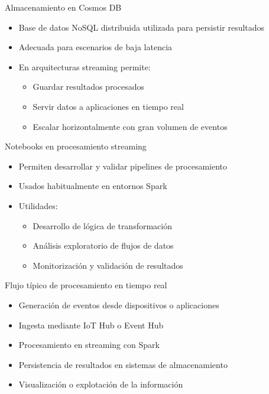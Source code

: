 \documentclass{beamer}
\begin{document}
\begin{frame}{Almacenamiento en Cosmos DB}
\begin{itemize}
    \item Base de datos NoSQL distribuida utilizada para persistir resultados
    \item Adecuada para escenarios de baja latencia
    \item En arquitecturas streaming permite:
    \begin{itemize}
        \item Guardar resultados procesados
        \item Servir datos a aplicaciones en tiempo real
        \item Escalar horizontalmente con gran volumen de eventos
    \end{itemize}
\end{itemize}
\end{frame}

\begin{frame}{Notebooks en procesamiento streaming}
\begin{itemize}
    \item Permiten desarrollar y validar pipelines de procesamiento
    \item Usados habitualmente en entornos Spark
    \item Utilidades:
    \begin{itemize}
        \item Desarrollo de lógica de transformación
        \item Análisis exploratorio de flujos de datos
        \item Monitorización y validación de resultados
    \end{itemize}
\end{itemize}
\end{frame}

\begin{frame}{Flujo típico de procesamiento en tiempo real}
\begin{itemize}
    \item Generación de eventos desde dispositivos o aplicaciones
    \item Ingesta mediante IoT Hub o Event Hub
    \item Procesamiento en streaming con Spark
    \item Persistencia de resultados en sistemas de almacenamiento
    \item Visualización o explotación de la información
\end{itemize}
\end{frame}
\end{document}
